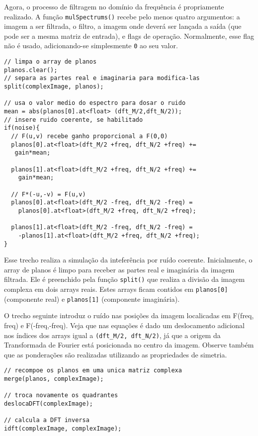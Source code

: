 \documentclass[11pt]{amsbook}
\begin{document}
Agora, o processo de filtragem no domínio da frequência é propriamente
realizado. A função \texttt{mulSpectrums()} recebe pelo menos quatro
argumentos: a imagem a ser filtrada, o filtro, a imagem onde deverá
ser lançada a saída (que pode ser a mesma matriz de entrada), e flags
de operação. Normalmente, esse flag não é usado, adicionando-se
simplesmente \texttt{0} ao seu valor.


\begin{verbatim}
// limpa o array de planos
planos.clear();
// separa as partes real e imaginaria para modifica-las
split(complexImage, planos);

// usa o valor medio do espectro para dosar o ruido
mean = abs(planos[0].at<float> (dft_M/2,dft_N/2));
// insere ruido coerente, se habilitado
if(noise){
  // F(u,v) recebe ganho proporcional a F(0,0)
  planos[0].at<float>(dft_M/2 +freq, dft_N/2 +freq) +=
   gain*mean;

  planos[1].at<float>(dft_M/2 +freq, dft_N/2 +freq) +=
    gain*mean;

  // F*(-u,-v) = F(u,v)
  planos[0].at<float>(dft_M/2 -freq, dft_N/2 -freq) =
    planos[0].at<float>(dft_M/2 +freq, dft_N/2 +freq);

  planos[1].at<float>(dft_M/2 -freq, dft_N/2 -freq) =
    -planos[1].at<float>(dft_M/2 +freq, dft_N/2 +freq);
}
\end{verbatim}

Esse trecho realiza a simulação da inteferência por ruído
coerente. Inicialmente, o array de planos é limpo para receber as
partes real e imaginária da imagem filtrada. Ele é preenchido pela
função \texttt{split()} que realiza a divisão da imagem complexa em dois
arrays reais. Estes arrays ficam contidos em \texttt{planos[0]} (componente
real) e \texttt{planos[1]} (componente imaginária).


O trecho seguinte introduz o ruído nas posições da imagem localicadas
em F(freq, freq) e F(-freq,-freq). Veja que
nas equações é dado um deslocamento adicional nos índices dos arrays
igual a \texttt{(dft_M/2, dft_N/2)}, já que a origem da Transformada de Fourier
está posicionada no centro da imagem. Observe também que as
ponderações são realizadas utilizando as propriedades de simetria.


\begin{verbatim}
// recompoe os planos em uma unica matriz complexa
merge(planos, complexImage);

// troca novamente os quadrantes
deslocaDFT(complexImage);

// calcula a DFT inversa
idft(complexImage, complexImage);
\end{verbatim}
\end{document}

